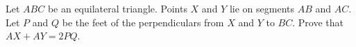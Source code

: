 Let $ABC$ be an equilateral triangle. Points $X$ and $Y$ lie on segments $AB$ and $AC$. Let $P$ and $Q$ be the feet of the perpendiculars from $X$ and $Y$ to $BC$. Prove that $AX+AY=2PQ$.
